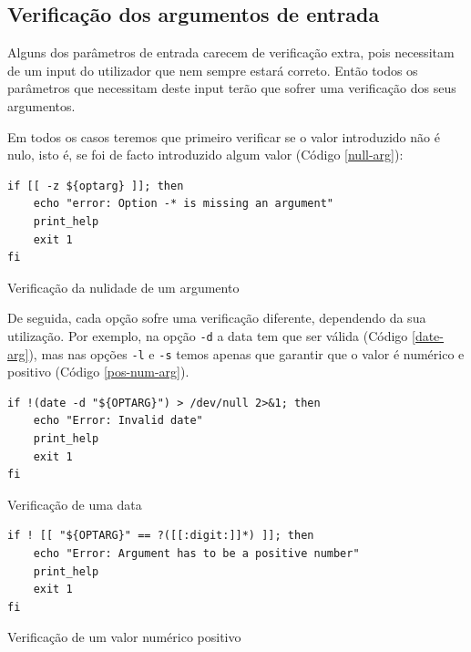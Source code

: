 \subsection{Verificação dos argumentos de entrada}

Alguns dos parâmetros de entrada carecem de verificação extra,
pois necessitam de um input do utilizador que nem sempre estará
correto. Então todos os parâmetros que necessitam deste input
terão que sofrer uma verificação dos seus argumentos.


Em todos os casos teremos que primeiro verificar se o valor
introduzido não é nulo, isto é, se foi de facto introduzido
algum valor (Código \ref{null-arg}):
\begin{listing}[H]
\begin{verbatim}
if [[ -z ${optarg} ]]; then
    echo "error: Option -* is missing an argument"
    print_help
    exit 1
fi
\end{verbatim}
\caption{Verificação da nulidade de um argumento}
\label{null-arg}
\end{listing}
De seguida, cada opção sofre uma verificação diferente,
dependendo da sua utilização. Por exemplo, na opção \verb|-d| a
data tem que ser válida (Código \ref{date-arg}), mas nas opções \verb|-l| e \verb|-s|
temos apenas que garantir que o valor é numérico e positivo (Código \ref{pos-num-arg}).
\begin{listing}[H]
\begin{verbatim}
if !(date -d "${OPTARG}") > /dev/null 2>&1; then
    echo "Error: Invalid date"
    print_help
    exit 1
fi
\end{verbatim}
\caption{Verificação de uma data}
\label{date-arg}
\end{listing}
\begin{listing}[H]
\begin{verbatim}
if ! [[ "${OPTARG}" == ?([[:digit:]]*) ]]; then
    echo "Error: Argument has to be a positive number"
    print_help
    exit 1
fi
\end{verbatim}
\caption{Verificação de um valor numérico positivo}
\label{pos-num-arg}
\end{listing}

